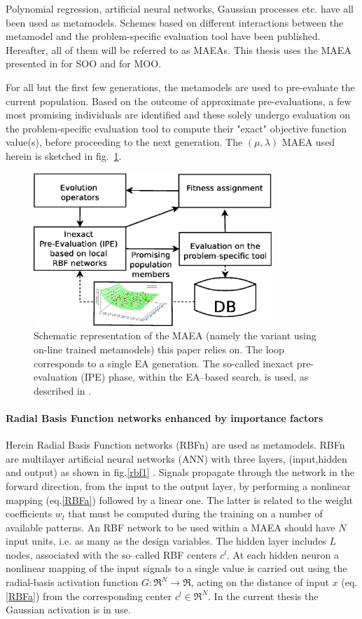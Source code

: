 Polynomial regression, artificial neural networks, Gaussian processes etc. have all been used as metamodels.  Schemes based on different interactions between the metamodel and the problem-specific evaluation tool have been published. Hereafter, all of them will be referred to as MAEAs. This thesis uses the MAEA presented in \cite{LTT_2_018} for SOO and \cite{LTT_2_029} for MOO. 

For all but the first few generations, the metamodels are used to pre-evaluate the current population. Based on the outcome of approximate pre-evaluations, a few most promising individuals are identified and these solely undergo evaluation on the problem-specific evaluation tool to compute their "exact" objective function value(s), before proceeding to the next generation. The $(\mu,\lambda)$ MAEA used herein is sketched in fig.~\ref{MAEA}.


\begin{figure}[h!]
\centering
\includegraphics[width=90mm]{MAEA.eps} 
\caption{Schematic representation of the MAEA (namely the variant using on-line trained metamodels) this paper relies on. The loop corresponds to a single EA generation. The so-called inexact pre-evaluation (IPE) phase, within the EA--based search, is used, as described in \cite{LTT_2_020,LTT_2_029}. }
\label{MAEA}
\end{figure}


\paragraph{Radial Basis Function networks enhanced by importance factors}
Herein Radial Basis Function networks (RBFn) are used as metamodels. RBFn are multilayer artificial neural networks (ANN) with three layers, (input,hidden and output) as shown in fig.\ref{rbf1} \cite{Haykin}. Signals propagate through the network in the forward direction, from the input to the output layer, by performing a nonlinear mapping (eq.\ref{RBFa}) followed by a linear one. The latter is related to the weight coefficients $w_l$ that must be computed during the training on a number of available patterns. An RBF network to be used within a MAEA should have $N$ input units, i.e. as many as the  design variables. The hidden layer includes $L$ nodes, associated with the so–called RBF centers $c^l$. At each hidden neuron a nonlinear mapping of the input signals to a single value is carried out using the radial-basis activation function $G:\Re^N \rightarrow \Re$, acting on the distance of input $x$ (eq.\ref{RBFa}) from the corresponding center $c^l \in \Re^N$.  In the current thesis the Gaussian activation is in use. 

